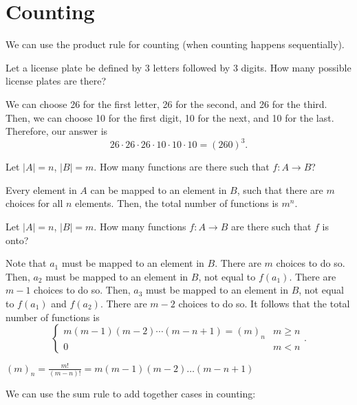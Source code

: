 
\section{Counting}

We can use the product rule for counting (when counting happens sequentially).

\begin{eg}
	Let a license plate be defined by 3 letters followed by 3 digits. How many possible license plates are there?
\end{eg}

We can choose 26 for the first letter, 26 for the second, and 26 for the third. Then, we can choose 10 for the first digit, 10 for the next, and 10 for the last. Therefore, our answer is \[
	26\cdot 26\cdot 26\cdot 10\cdot 10\cdot 10=(260)^3
.\] 

\begin{eg}
	Let \( |A|=n \), \( |B|=m \). How many functions are there such that \( f:A\to B \)?
\end{eg}

Every element in \( A \) can be mapped to an element in \( B \), such that there are \( m \) choices for all \( n \) elements. Then, the total number of functions is \( m^n\).

\begin{eg}
	Let \( |A|=n \), \( |B|=m \). How many functions \( f:A\to B \) are there such that \( f \) is onto?
\end{eg}

Note that \( a_{1} \) must be mapped to an element in \( B \). There are \( m \) choices to do so. Then, \( a_{2} \) must be mapped to an element in \( B \), not equal to \( f(a_{1}) \). There are \( m-1 \) choices to do so. Then, \( a_{3} \) must be mapped to an element in \( B \), not equal to \( f(a_{1}) \) and \( f(a_{2}) \). There are \( m-2 \) choices to do so. It follows that the total number of functions is \[
	\begin{cases}
		m(m-1)(m-2)\cdots(m-n+1)=(m)_n & m \ge n\\
		0 & m < n
	\end{cases}
.\] 

\begin{notation}
	\( (m)_n = \frac{m!}{(m-n)!} = m(m-1)(m-2)\ldots (m-n+1)\) 
\end{notation}

We can use the sum rule to add together cases in counting:

